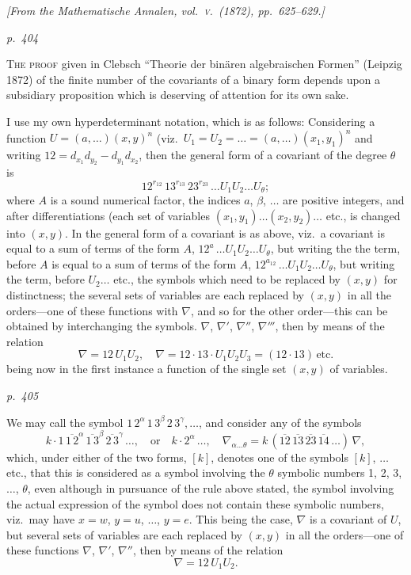 \documentclass[11pt,a4paper]{book}
\begin{document}
\begin{center}
\textit{[From the Mathematische Annalen, vol.~\textsc{v}.\ (1872), pp.~625--629.]}
\end{center}

\textit{p.~404}

\noindent
\textsc{The proof} given in Clebsch ``Theorie der bin\"aren algebraischen Formen'' (Leipzig 1872)
of the finite number of the covariants of a binary form depends upon a subsidiary
proposition which is deserving of attention for its own sake.

I use my own hyperdeterminant notation, which is as follows: Considering a
function $U = (a, \ldots)(x, y)^n$ (viz.\ $U_1 = U_2 = \ldots = (a, \ldots)(x_1, y_1)^n$ and writing $12 = d_{x_1} d_{y_2} - d_{y_1} d_{x_2}$,
then the general form of a covariant of the degree $\theta$ is
\[
12^{r_{12}}\,13^{r_{13}}\,23^{r_{23}}\,\ldots U_1 U_2 \ldots U_\theta;
\]
where $A$ is a sound numerical factor, the indices $a$, $\beta$, $\ldots$ are positive integers, and
after differentiations (each set of variables $(x_1, y_1)\ldots(x_2, y_2)\ldots$ etc., is changed into
$(x, y)$.  In the general form of a covariant is as above, viz.\ a covariant is equal to
a sum of terms of the form $A$, $12^{a}\,\ldots U_1 U_2 \ldots U_\theta$, but writing the the term, before
$A$ is equal to a sum of terms of the form $A$, $12^{a_{12}}\,\ldots U_1 U_2 \ldots U_\theta$, but writing the term, before
$U_2 \ldots$ etc., the symbols which need to be replaced by $(x, y)$ for distinctness; the
several sets of variables are each replaced by $(x, y)$ in all the orders---one of these
functions with $\nabla$, and so for the other order---this can be obtained by interchanging
the symbols.  $\nabla$, $\nabla'$, $\nabla''$, $\nabla'''$, then by means of the relation
\[
\nabla = 12 \, U_1 U_2,\quad \nabla = 12 \cdot 13 \cdot U_1 U_2 U_3 = (12 \cdot 13)\,\text{etc.}
\]
being now in the first instance a function of the single set $(x, y)$ of variables.

\clearpage

\bigskip
\textit{p.~405}
\smallskip

\noindent
We may call the symbol $1\,2^{\alpha}\,1\,3^{\beta}\,2\,3^{\gamma}, \ldots$, and consider any of the symbols
\[
k \cdot 1\,\overline{1\,2}^{\alpha}\,\overline{1\,3}^{\beta}\,\overline{2\,3}^{\gamma}\,\ldots,\quad \text{or}\quad k \cdot 2^{\alpha}\,\ldots,\quad \nabla_{\alpha\ldots\theta} = k\,(\overline{12}\,\overline{13}\,\overline{23}\,\overline{14}\,\ldots)\,\nabla,
\]
which, under either of the two forms, $[k]$, denotes one of the symbols $[k]$, $\ldots$ etc.,
that this is considered as a symbol involving the $\theta$ symbolic numbers 1, 2, 3, $\ldots$, $\theta$,
even although in pursuance of the rule above stated, the symbol involving
the actual expression of the symbol does not contain these symbolic numbers, viz.\ may
have $x = w$, $y = u$, $\ldots$, $y = e$.  This being the case, $\nabla$ is a covariant of $U$, but
several sets of variables are each replaced by $(x, y)$ in all the orders---one of these
functions $\nabla$, $\nabla'$, $\nabla''$, then by means of the relation
\[
\nabla = 12 \, U_1 U_2.
\]
\end{document}
